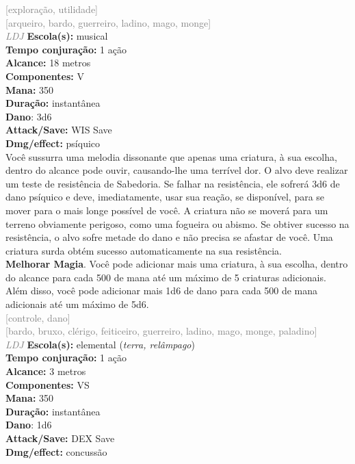 \documentclass{RPG_Adventure}[2021/10/20]
\begin{document}
{\scriptsize \textcolor{gray}{[exploração, utilidade]\\}}
{\scriptsize \textcolor{gray}{[arqueiro, bardo, guerreiro, ladino, mago, monge]\\}}
{\tiny \textcolor{gray}{\textit{LDJ}}}\jump{}
{\small \t \textbf{Escola(s):} musical\\\t \textbf{Tempo conjuração:} 1 ação\\\t \textbf{Alcance:} 18 metros\\\t \textbf{Componentes:} V\\\t \textbf{Mana:} 350\\\t \textbf{Duração:} instantânea\\\t \textbf{Dano}: 3d6\\\t \textbf{Attack/Save:} WIS Save\\\t \textbf{Dmg/effect:} psíquico\\}
{\normalsize Você sussurra uma melodia dissonante que apenas uma criatura, à sua escolha, dentro do alcance pode ouvir, causando-lhe uma terrível dor. O alvo deve realizar um teste de resistência de Sabedoria. Se falhar na resistência, ele sofrerá 3d6 de dano psíquico e deve, imediatamente, usar sua reação, se disponível, para se mover para o mais longe possível de você. A criatura não se moverá para um terreno obviamente perigoso, como uma fogueira ou abismo. Se obtiver sucesso na resistência, o alvo sofre metade do dano e não precisa se afastar de você. Uma criatura surda obtém sucesso automaticamente na sua resistência.\\\t \textbf{Melhorar Magia}. Você pode adicionar mais uma criatura, à sua escolha, dentro do alcance para cada 500 de mana até um máximo de 5 criaturas adicionais. Além disso, você pode adicionar mais 1d6 de dano para cada 500 de mana adicionais até um máximo de 5d6.\\}
{\scriptsize \textcolor{gray}{[controle, dano]\\}}
{\scriptsize \textcolor{gray}{[bardo, bruxo, clérigo, feiticeiro, guerreiro, ladino, mago, monge, paladino]\\}}
{\tiny \textcolor{gray}{\textit{LDJ}}}\jump{}
{\small \t \textbf{Escola(s):} elemental (\textit{terra, relâmpago})\\\t \textbf{Tempo conjuração:} 1 ação\\\t \textbf{Alcance:} 3 metros\\\t \textbf{Componentes:} VS\\\t \textbf{Mana:} 350\\\t \textbf{Duração:} instantânea\\\t \textbf{Dano}: 1d6\\\t \textbf{Attack/Save:} DEX Save\\\t \textbf{Dmg/effect:} concussão\\}
\end{document}
